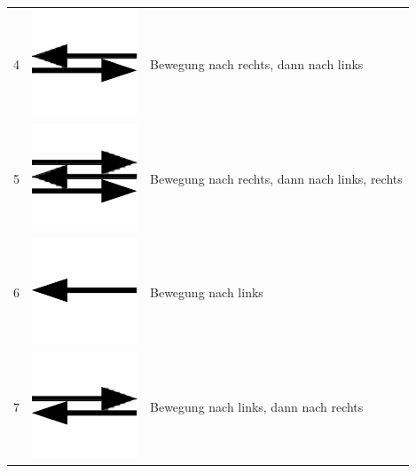 \documentclass[11pt,a4paper,notitlepage]{article}
\begin{document}
\begin{center}
\begin{supertabular}{rcl}
  4 & \includegraphics[scale=0.25]{img/right-left} & Bewegung nach rechts, dann nach links \\
  5 & \includegraphics[scale=0.25]{img/right-left-right} & Bewegung nach rechts, dann nach links, rechts \\
  6 & \includegraphics[scale=0.25]{img/left} & Bewegung nach links \\
  7 & \includegraphics[scale=0.25]{img/left-right} & Bewegung nach links, dann nach rechts \\

\end{supertabular}
\end{center}
\end{document}
